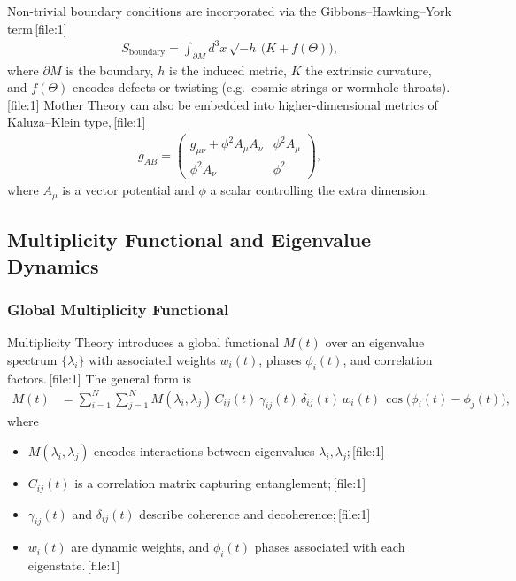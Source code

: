 \documentclass[11pt]{article}
\begin{document}
Non-trivial boundary conditions are incorporated via the Gibbons--Hawking--York term\,[file:1]
\begin{align}
S_{\mathrm{boundary}}
=
\int_{\partial M} d^3x\,\sqrt{-h}\,\bigl(K+f(\Theta)\bigr),
\end{align}
where \(\partial M\) is the boundary, \(h\) is the induced metric, \(K\) the extrinsic curvature, and \(f(\Theta)\) encodes defects or twisting (e.g.\ cosmic strings or wormhole throats).\,[file:1] Mother Theory can also be embedded into higher-dimensional metrics of Kaluza--Klein type,\,[file:1]
\begin{align}
g_{AB}
=
\begin{pmatrix}
g_{\mu\nu}+\phi^{2} A_{\mu} A_{\nu} & \phi^{2} A_{\mu}\\
\phi^{2} A_{\nu} & \phi^{2}
\end{pmatrix},
\end{align}
where \(A_\mu\) is a vector potential and \(\phi\) a scalar controlling the extra dimension.

\subsection{Multiplicity Functional and Eigenvalue Dynamics}

\subsubsection{Global Multiplicity Functional}

Multiplicity Theory introduces a global functional \(M(t)\) over an eigenvalue spectrum \(\{\lambda_i\}\) with associated weights \(w_i(t)\), phases \(\phi_i(t)\), and correlation factors.\,[file:1] The general form is
\begin{align}
M(t)
&=
\sum_{i=1}^{N}\sum_{j=1}^{N}
M(\lambda_i,\lambda_j)\,
C_{ij}(t)\,
\gamma_{ij}(t)\,
\delta_{ij}(t)\,
w_i(t)\,
\cos\bigl(\phi_i(t)-\phi_j(t)\bigr),
\label{eq:Multiplicity}
\end{align}
where
\begin{itemize}
  \item \(M(\lambda_i,\lambda_j)\) encodes interactions between eigenvalues \(\lambda_i,\lambda_j\);\,[file:1]
  \item \(C_{ij}(t)\) is a correlation matrix capturing entanglement;\,[file:1]
  \item \(\gamma_{ij}(t)\) and \(\delta_{ij}(t)\) describe coherence and decoherence;\,[file:1]
  \item \(w_i(t)\) are dynamic weights, and \(\phi_i(t)\) phases associated with each eigenstate.\,[file:1]
\end{itemize}
\end{document}
